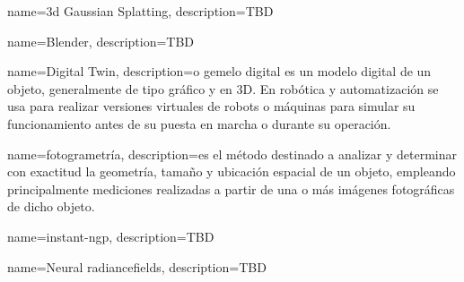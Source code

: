 


{
    name={\acrshort{3d} Gaussian Splatting},
    description={TBD}
}



{
    name={Blender},
    description={TBD}
}



{
    name={Digital Twin},
    description={o gemelo digital es un modelo digital de un objeto, generalmente de tipo gráfico y en 3D. En robótica y automatización se usa para realizar versiones virtuales de robots o máquinas para simular su funcionamiento antes de su puesta en marcha o durante su operación.}
}



{
    name={fotogrametría},
    description={es el método destinado a analizar y determinar con exactitud la geometría, tamaño y ubicación espacial de un objeto, empleando principalmente mediciones realizadas a partir de una o más imágenes fotográficas de dicho objeto.}
}




{
    name={instant-ngp},
    description={TBD}
}






{
    name={Neural \glspl{radiancefield}},
    description={TBD}
}


